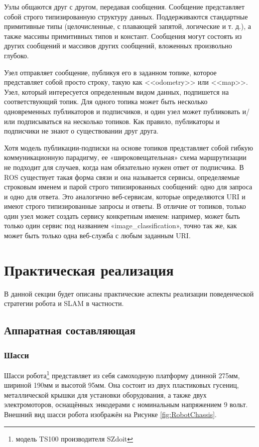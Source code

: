 \documentclass[12pt,a4paper]{scrartcl}
\begin{document}
					Узлы общаются друг с другом, передавая сообщения. Сообщение представляет собой строго типизированную структуру данных. Поддерживаются стандартные примитивные типы (целочисленные, с плавающей запятой, логические и т. д.), а также массивы примитивных типов и констант. Сообщения могут состоять из других сообщений и массивов других сообщений, вложенных произвольно глубоко.
					
					Узел отправляет сообщение, публикуя его в заданном топике, которое представляет собой просто строку, такую как <<odometry>> или <<map>>. Узел, который интересуется определенным видом данных, подпишется на соответствующий топик. Для одного топика может быть несколько одновременных публикаторов и подписчиков, и один узел может публиковать и/или подписываться на несколько топиков. Как правило, публикаторы и подписчики не знают о существовании друг друга.
					
					Хотя модель публикации-подписки на основе топиков представляет собой гибкую коммуникационную парадигму, ее «широковещательная» схема маршрутизации не подходит для случаев, когда нам обязательно нужен ответ от подписчика. В ROS существует такая форма связи и она называется сервисы, определяемые строковым именем и парой строго типизированных сообщений: одно для запроса и одно для ответа. Это аналогично веб-сервисам, которые определяются URI и имеют строго типизированные запросы и ответы. В отличие от топиков, только один узел может создать сервису конкретным именем: например, может быть только один сервис под названием «image\_classification», точно так же, как может быть только одна веб-служба с любым заданным URI\cite{bib:ROSTerms}.
			
		\section{Практическая реализация} \label{sec:practice}
		
			В данной секции будет описаны практические аспекты реализации поведенческой стратегии робота и SLAM в частности.
			\subsection{Аппаратная составляющая}
				\subsubsection{Шасси}
					Шасси робота\footnote{модель TS100 производителя SZdoit} представляет из себя самоходную платформу длинной 275мм, шириной 190мм и высотой 95мм. Она состоит из двух пластиковых гусениц, металлической крышки для установки оборудования, а также двух электромоторов, оснащённых энкодерами с номинальным напряжением 9 вольт\cite{bib:TS100Desc}. Внешний вид шасси робота изображён на Рисунке \ref{fig:RobotChassis}.
\end{document}
